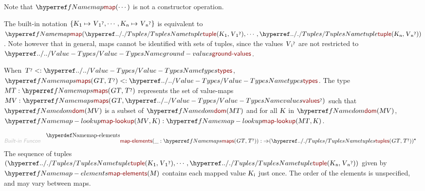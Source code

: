 Note that $\SHADE{\NAMEREF{map}
           (  \cdots )}$ is not a constructor operation.

The built-in notation $\SHADE{\{ \VAR{K}\SUB{1} \mapsto 
              \VAR{V}\SUB{1}\QUERY, 
            \cdots, 
            \VAR{K}\SUB{n} \mapsto 
              \VAR{V}\SUB{n}\QUERY \}}$ is equivalent to 
  $\SHADE{\NAMEREF{map}
           (  \NAMEHYPER{../.}{Tuples}{tuple}
                   (  \VAR{K}\SUB{1}, 
                          \VAR{V}\SUB{1}\QUERY ), 
                  \cdots, 
                  \NAMEHYPER{../.}{Tuples}{tuple}
                   (  \VAR{K}\SUB{n}, 
                          \VAR{V}\SUB{n}\QUERY ) )}$. Note however that in general, 
  maps cannot be identified with sets of tuples, since the values $\SHADE{\VAR{V}\SUB{i}\QUERY}$ are 
  not restricted to $\SHADE{\NAMEHYPER{../..}{Value-Types}{ground-values}}$.

When $\SHADE{\VAR{T}\QUERY <: \NAMEHYPER{../..}{Value-Types}{types}}$, $\SHADE{\NAMEREF{maps}
           (  \VAR{GT}, 
                  \VAR{T}\QUERY ) <: \NAMEHYPER{../..}{Value-Types}{types}}$. The type $\SHADE{\VAR{MT} : \NAMEREF{maps}
                     (  \VAR{GT}, 
                            \VAR{T}\QUERY )}$
  represents the set of value-maps $\SHADE{\VAR{MV} : \NAMEREF{maps}
                     (  \VAR{GT}, 
                            \NAMEHYPER{../..}{Value-Types}{values}\QUERY )}$ such that 
  $\SHADE{\NAMEREF{dom}
           (  \VAR{MV} )}$ is a subset of $\SHADE{\NAMEREF{dom}
           (  \VAR{MT} )}$ and for all $\SHADE{\VAR{K}}$ in $\SHADE{\NAMEREF{dom}
           (  \VAR{MV} )}$, 
  $\SHADE{ \NAMEREF{map-lookup}
                       (  \VAR{MV}, 
                              \VAR{K} ) : \NAMEREF{map-lookup}
                                 (  \VAR{MT}, 
                                        \VAR{K} )}$.

\begin{align*}
  \KEY{Built-in Funcon} \quad
  & \NAMEDECL{map-elements}(
                       \_ : \NAMEREF{maps}
                                 (  \VAR{GT}, 
                                        \VAR{T}\QUERY )) 
    :  \TO (  \NAMEHYPER{../.}{Tuples}{tuples}
                           (  \VAR{GT}, 
                                  \VAR{T}\QUERY ) )\STAR 
\end{align*}
The sequence of tuples $\SHADE{(  \NAMEHYPER{../.}{Tuples}{tuple}
                 (  \VAR{K}\SUB{1}, 
                        \VAR{V}\SUB{1}\QUERY ), 
                \cdots, 
                \NAMEHYPER{../.}{Tuples}{tuple}
                 (  \VAR{K}\SUB{n}, 
                        \VAR{V}\SUB{n}\QUERY ) )}$ given by
  $\SHADE{\NAMEREF{map-elements}
           (  \VAR{M} )}$ contains each mapped value $\SHADE{\VAR{K}\SUB{i}}$ just once. The order of
  the elements is unspecified, and may vary between maps.

